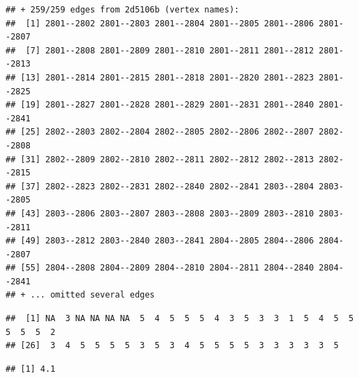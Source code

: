 \documentclass[
]{book}
\newenvironment{Shaded}{\begin{snugshade}}{\end{snugshade}}
\newcommand{\AttributeTok}[1]{\textcolor[rgb]{0.77,0.63,0.00}{#1}}
\newcommand{\CommentTok}[1]{\textcolor[rgb]{0.56,0.35,0.01}{\textit{#1}}}
\newcommand{\ConstantTok}[1]{\textcolor[rgb]{0.00,0.00,0.00}{#1}}
\newcommand{\FunctionTok}[1]{\textcolor[rgb]{0.00,0.00,0.00}{#1}}
\newcommand{\NormalTok}[1]{#1}
\newcommand{\SpecialCharTok}[1]{\textcolor[rgb]{0.00,0.00,0.00}{#1}}
\begin{document}
\begin{verbatim}
## + 259/259 edges from 2d5106b (vertex names):
##  [1] 2801--2802 2801--2803 2801--2804 2801--2805 2801--2806 2801--2807
##  [7] 2801--2808 2801--2809 2801--2810 2801--2811 2801--2812 2801--2813
## [13] 2801--2814 2801--2815 2801--2818 2801--2820 2801--2823 2801--2825
## [19] 2801--2827 2801--2828 2801--2829 2801--2831 2801--2840 2801--2841
## [25] 2802--2803 2802--2804 2802--2805 2802--2806 2802--2807 2802--2808
## [31] 2802--2809 2802--2810 2802--2811 2802--2812 2802--2813 2802--2815
## [37] 2802--2823 2802--2831 2802--2840 2802--2841 2803--2804 2803--2805
## [43] 2803--2806 2803--2807 2803--2808 2803--2809 2803--2810 2803--2811
## [49] 2803--2812 2803--2840 2803--2841 2804--2805 2804--2806 2804--2807
## [55] 2804--2808 2804--2809 2804--2810 2804--2811 2804--2840 2804--2841
## + ... omitted several edges
\end{verbatim}

\begin{Shaded}
\end{Shaded}

\begin{verbatim}
##  [1] NA  3 NA NA NA NA  5  4  5  5  5  4  3  5  3  3  1  5  4  5  5  5  5  5  2
## [26]  3  4  5  5  5  5  3  5  3  4  5  5  5  5  3  3  3  3  3  5
\end{verbatim}

\begin{Shaded}
\end{Shaded}

\begin{verbatim}
## [1] 4.1
\end{verbatim}

\begin{Shaded}
\end{Shaded}
\end{document}

